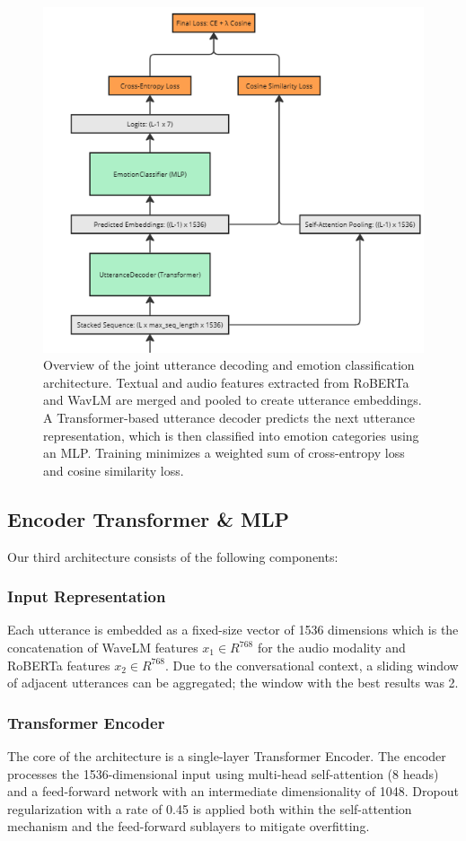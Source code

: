 \documentclass{article}
\begin{document}
\begin{figure}
    \centering
    \includegraphics[width=0.8\linewidth]{Images/transformer_decoder.png}
    \caption{Overview of the joint utterance decoding and emotion classification architecture. Textual and audio features extracted from RoBERTa and WavLM are merged and pooled to create utterance embeddings. A Transformer-based utterance decoder predicts the next utterance representation, which is then classified into emotion categories using an MLP. Training minimizes a weighted sum of cross-entropy loss and cosine similarity loss.}
    \label{fig:transf-dec}
\end{figure}


\subsection{Encoder Transformer \& MLP}
Our third architecture consists of the following components:

\subsubsection{Input Representation}
Each utterance is embedded as a fixed-size vector of 1536 dimensions which is the concatenation of WaveLM features $x_1 \in R^{768}$ for the audio modality and RoBERTa features $x_2 \in R^{768}$. Due to the conversational context, a sliding window of adjacent utterances can be aggregated; the window with the best results was 2.

\subsubsection{Transformer Encoder}
The core of the architecture is a single-layer Transformer Encoder. The encoder processes the 1536-dimensional input using multi-head self-attention (8 heads) and a feed-forward network with an intermediate dimensionality of 1048. Dropout regularization with a rate of 0.45 is applied both within the self-attention mechanism and the feed-forward sublayers to mitigate overfitting.
\end{document}

